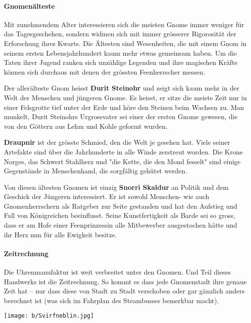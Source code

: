 \documentclass[10pt,twoside,twocolumn,openany]{book}
\begin{document}
\begin{multicols}{2}
\paragraph{Gnomenälteste}
Mit zunehmendem Alter interessieren sich die meisten Gnome immer weniger für das Tagesgeschehen, sondern widmen sich mit immer grösserer Rigorosität der Erforschung ihres Kwarts. Die Ältesten sind Wesenheiten, die mit einem Gnom in seinem ersten Lebensjahrhundert kaum mehr etwas gemeinsam haben. Um die Taten ihrer Jugend ranken sich unzählige Legenden und ihre magischen Kräfte können sich durchaus mit denen der grössten Feenherrscher messen.
	
Der allerälteste Gnom heisst \textbf{Durit Steinohr} und zeigt sich kaum mehr in der Welt der Menschen und jüngeren Gnome. Es heisst, er sitze die meiste Zeit nur in einer Felsgrotte tief unter der Erde und höre den Steinen beim Wachsen zu. Man munkelt, Durit Steinohrs Urgrossvater sei einer der ersten Gnome gewesen, die von den Göttern aus Lehm und Kohle geformt wurden.
	
\textbf{Draupnir} ist der grösste Schmied, den die Welt je gesehen hat. Viele seiner Artefakte sind über die Jahrhunderte in alle Winde zerstreut worden. Die Krone Norges, das Schwert Stahlherz und "die Kette, die den Mond fesselt" sind einige Gegenstände in Menschenhand, die sorgfältig gehütet werden.
	
Von diesen ältesten Gnomen ist einzig \textbf{Snorri Skaldur} an Politik und dem Geschick der Jüngeren interessiert. Er ist sowohl Menschen- wie auch Gnomenherrschern als Ratgeber zur Seite gestanden und hat den Aufstieg und Fall von Königreichen beeinflusst. Seine Kunstfertigkeit als Barde sei so gross, dass er am Hofe einer Feenprinzessin alle Mitbewerber ausgestochen hätte und ihr Herz nun für alle Ewigkeit besitze. 
	
\paragraph{Zeitrechnung}
Die Uhrenmanufaktur ist weit verbreitet unter den Gnomen. Und Teil dieses Handwerks ist die Zeitrechnung. So kommt es dass jede Gnomenstadt ihre genaue Zeit hat – nur dass diese von Stadt zu Stadt verschoben oder gar gänzlich anders berechnet ist (was sich im Fahrplan des Steambusses bemerkbar macht).
	
	\texttt{[image: b/Svirfneblin.jpg]}
	
	
\end{multicols}
\end{document}
